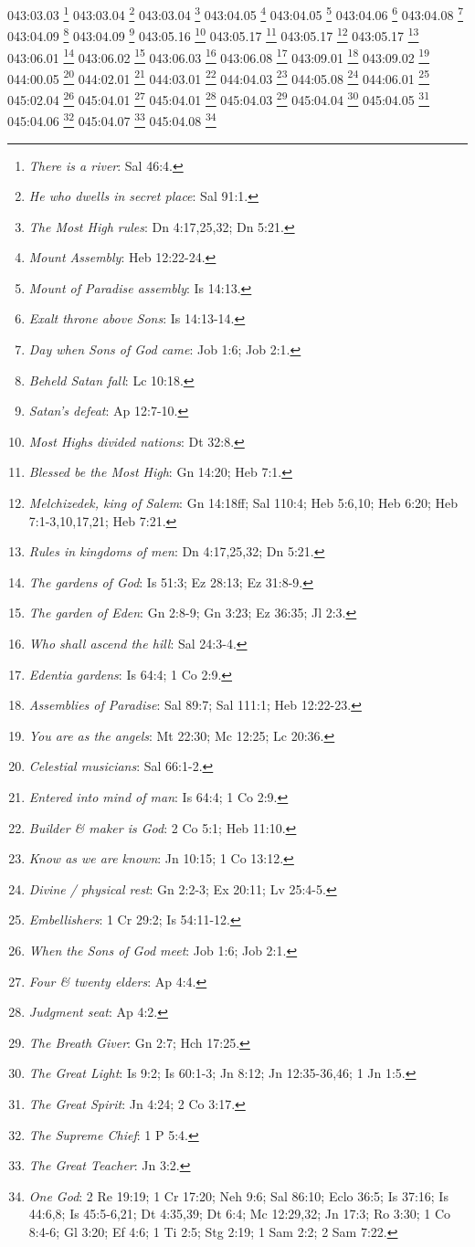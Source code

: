 043:03.03 \footnote{\textit{There is a river}: Sal 46:4.}
043:03.04 \footnote{\textit{He who dwells in secret place}: Sal 91:1.}
043:03.04 \footnote{\textit{The Most High rules}: Dn 4:17,25,32; Dn 5:21.}
043:04.05 \footnote{\textit{Mount Assembly}: Heb 12:22-24.}
043:04.05 \footnote{\textit{Mount of Paradise assembly}: Is 14:13.}
043:04.06 \footnote{\textit{Exalt throne above Sons}: Is 14:13-14.}
043:04.08 \footnote{\textit{Day when Sons of God came}: Job 1:6; Job 2:1.}
043:04.09 \footnote{\textit{Beheld Satan fall}: Lc 10:18.}
043:04.09 \footnote{\textit{Satan's defeat}: Ap 12:7-10.}
043:05.16 \footnote{\textit{Most Highs divided nations}: Dt 32:8.}
043:05.17 \footnote{\textit{Blessed be the Most High}: Gn 14:20; Heb 7:1.}
043:05.17 \footnote{\textit{Melchizedek, king of Salem}: Gn 14:18ff; Sal 110:4; Heb 5:6,10; Heb 6:20; Heb 7:1-3,10,17,21; Heb 7:21.}
043:05.17 \footnote{\textit{Rules in kingdoms of men}: Dn 4:17,25,32; Dn 5:21.}
043:06.01 \footnote{\textit{The gardens of God}: Is 51:3; Ez 28:13; Ez 31:8-9.}
043:06.02 \footnote{\textit{The garden of Eden}: Gn 2:8-9; Gn 3:23; Ez 36:35; Jl 2:3.}
043:06.03 \footnote{\textit{Who shall ascend the hill}: Sal 24:3-4.}
043:06.08 \footnote{\textit{Edentia gardens}: Is 64:4; 1 Co 2:9.}
043:09.01 \footnote{\textit{Assemblies of Paradise}: Sal 89:7; Sal 111:1; Heb 12:22-23.}
043:09.02 \footnote{\textit{You are as the angels}: Mt 22:30; Mc 12:25; Lc 20:36.}
044:00.05 \footnote{\textit{Celestial musicians}: Sal 66:1-2.}
044:02.01 \footnote{\textit{Entered into mind of man}: Is 64:4; 1 Co 2:9.}
044:03.01 \footnote{\textit{Builder & maker is God}: 2 Co 5:1; Heb 11:10.}
044:04.03 \footnote{\textit{Know as we are known}: Jn 10:15; 1 Co 13:12.}
044:05.08 \footnote{\textit{Divine / physical rest}: Gn 2:2-3; Ex 20:11; Lv 25:4-5.}
044:06.01 \footnote{\textit{Embellishers}: 1 Cr 29:2; Is 54:11-12.}
045:02.04 \footnote{\textit{When the Sons of God meet}: Job 1:6; Job 2:1.}
045:04.01 \footnote{\textit{Four & twenty elders}: Ap 4:4.}
045:04.01 \footnote{\textit{Judgment seat}: Ap 4:2.}
045:04.03 \footnote{\textit{The Breath Giver}: Gn 2:7; Hch 17:25.}
045:04.04 \footnote{\textit{The Great Light}: Is 9:2; Is 60:1-3; Jn 8:12; Jn 12:35-36,46; 1 Jn 1:5.}
045:04.05 \footnote{\textit{The Great Spirit}: Jn 4:24; 2 Co 3:17.}
045:04.06 \footnote{\textit{The Supreme Chief}: 1 P 5:4.}
045:04.07 \footnote{\textit{The Great Teacher}: Jn 3:2.}
045:04.08 \footnote{\textit{One God}: 2 Re 19:19; 1 Cr 17:20; Neh 9:6; Sal 86:10; Eclo 36:5; Is 37:16; Is 44:6,8; Is 45:5-6,21; Dt 4:35,39; Dt 6:4; Mc 12:29,32; Jn 17:3; Ro 3:30; 1 Co 8:4-6; Gl 3:20; Ef 4:6; 1 Ti 2:5; Stg 2:19; 1 Sam 2:2; 2 Sam 7:22.}
